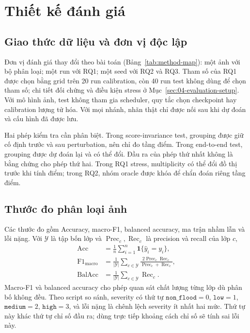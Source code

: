 \section{Thiết kế đánh giá}\label{sec:02-evaluation-design}
\subsection{Giao thức dữ liệu và đơn vị độc lập}
Đơn vị đánh giá thay đổi theo bài toán (Bảng~\ref{tab:method-map}): một ảnh với bộ phân loại; một run với RQ1; một seed với RQ2 và RQ3. Tham số của RQ1 được chọn bằng grid trên 20 run calibration, còn 40 run test không dùng để chọn tham số; chi tiết đối chứng và điều kiện stress ở Mục~\ref{sec:04-evaluation-setup}. Với mô hình ảnh, test không tham gia scheduler, quy tắc chọn checkpoint hay calibration lượng tử hóa. Với mọi nhánh, nhãn thật chỉ được nối sau khi dự đoán và cấu hình đã được lưu.

Hai phép kiểm tra cần phân biệt. Trong score-invariance test, grouping được giữ cố định trước và sau perturbation, nên chỉ đo tầng điểm. Trong end-to-end test, grouping được dự đoán lại và có thể đổi. Đầu ra của phép thứ nhất không là bằng chứng cho phép thứ hai. Trong RQ1 stress, multiplicity có thể đổi đồ thị trước khi tính điểm; trong RQ2, nhóm oracle được khóa để chẩn đoán riêng tầng điểm.

\subsection{Thước đo phân loại ảnh}\label{sec:02-metrics-image}
Các thước đo gồm Accuracy, macro-F1, balanced accuracy, ma trận nhầm lẫn và lỗi nặng. Với $\mathcal Y$ là tập bốn lớp và $\operatorname{Prec}_c,\operatorname{Rec}_c$ là precision và recall của lớp $c$,
\begin{align}
 \operatorname{Acc}&=\frac{1}{n}\sum_{i=1}^{n}\mathbf{1}\{\widehat y_i=y_i\},\nonumber\\
 \operatorname{F1}_{\mathrm{macro}}&=\frac{1}{|\mathcal Y|}\sum_{c\in\mathcal Y}\frac{2\operatorname{Prec}_c\operatorname{Rec}_c}{\operatorname{Prec}_c+\operatorname{Rec}_c},\nonumber\\
 \operatorname{BalAcc}&=\frac{1}{|\mathcal Y|}\sum_{c\in\mathcal Y}\operatorname{Rec}_c.
 \label{eq:image-metrics}
\end{align}
Macro-F1 và balanced accuracy cho phép quan sát chất lượng từng lớp dù phân bố không đều. Theo script so sánh, severity có thứ tự $\texttt{non\_flood}=0$, $\texttt{low}=1$, $\texttt{medium}=2$, $\texttt{high}=3$, và lỗi nặng là chênh lệch severity ít nhất hai mức. Thứ tự này khác thứ tự chỉ số đầu ra; dùng trực tiếp khoảng cách chỉ số sẽ tính sai lỗi này.

